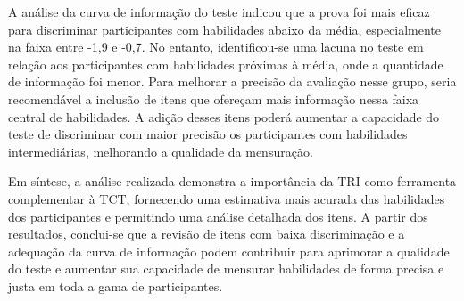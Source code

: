 A análise da curva de informação do teste indicou que a prova foi mais eficaz para discriminar participantes com habilidades abaixo da média, especialmente na faixa entre -1,9 e -0,7. No entanto, identificou-se uma lacuna no teste em relação aos participantes com habilidades próximas à média, onde a quantidade de informação foi menor. Para melhorar a precisão da avaliação nesse grupo, seria recomendável a inclusão de itens que ofereçam mais informação nessa faixa central de habilidades. A adição desses itens poderá aumentar a capacidade do teste de discriminar com maior precisão os participantes com habilidades intermediárias, melhorando a qualidade da mensuração.

Em síntese, a análise realizada demonstra a importância da TRI como ferramenta complementar à TCT, fornecendo uma estimativa mais acurada das habilidades dos participantes e permitindo uma análise detalhada dos itens. A partir dos resultados, conclui-se que a revisão de itens com baixa discriminação e a adequação da curva de informação podem contribuir para aprimorar a qualidade do teste e aumentar sua capacidade de mensurar habilidades de forma precisa e justa em toda a gama de participantes.
